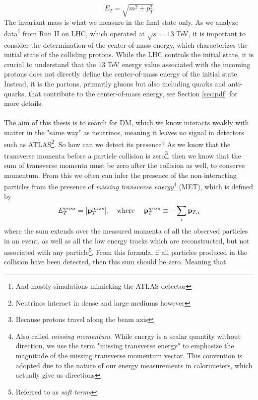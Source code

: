 \documentclass[12pt, a4paper]{book}
\begin{document}
\begin{equation}\label{eq:transverse_energy}
    E_T = \sqrt{m^2 + p_T^2}
\end{equation}
The invariant mass is what we measure in the final state only. 
As we analyze data\footnote{And mostly simulations mimicking the ATLAS detector} from Run II on LHC, which operated at $\sqrt s = 13$ TeV, it is important to consider the determination of the center-of-mass energy, which characterizes the initial state of the colliding protons. 
While the LHC controls the initial state, it is crucial to understand that the 13 TeV energy value associated with the incoming protons does not directly define the center-of-mass energy of the initial state. Instead, it is the partons, 
primarily gluons but also including quarks and anti-quarks, that contribute to the center-of-mass energy, see Section \ref{sec:pdf} for more details.\\
\\The aim of this thesis is to search for DM, which we know interacts weakly with matter in the "same way" as neutrinos, meaning it leaves no signal in detectors such as ATLAS\footnote{Neutrinos interact in dense and large mediums however}. So how can we detect its presence? 
As we know that the transverse momenta before a particle collision is zero\footnote{Because protons travel along the beam axis}, then we know that the sum of transverse momenta must be zero after the collision as well, to conserve momentum.
From this we often can infer the presence of the non-interacting particles from the presence of \textit{missing transverse energy}\footnote{Also called \textit{missing momentum}. While energy is a scalar quantity without direction, we use the term "missing transverse energy" to emphasize the magnitude of the missing transverse momentum vector. This convention is adopted due to the nature of our energy measurements in calorimeters, which actually give us directions} 
(MET), which is defined by 
\begin{equation}\label{eq:MET}
    E_T^{miss} = \abs{\mathbf{p}_T^{miss}},\quad\text{where }\quad \mathbf{p}_T^{miss} \equiv -\sum_i \mathbf{p}_{T,i}
\end{equation}
where the sum extends over the measured momenta of all the observed particles in an event, as well as all the low energy tracks which are reconstructed, but not associated with any particle\footnote{Referred to as \textit{soft terms}}. From this formula, if all particles produced in the collision have been detected, then this sum should be zero. Meaning that 
\end{document}
